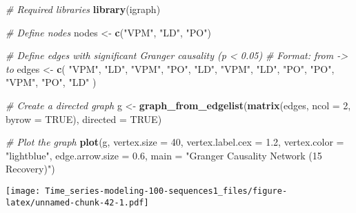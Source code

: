 \documentclass[
]{article}
\newenvironment{Shaded}{\begin{snugshade}}{\end{snugshade}}
\newcommand{\AttributeTok}[1]{\textcolor[rgb]{0.13,0.29,0.53}{#1}}
\newcommand{\CommentTok}[1]{\textcolor[rgb]{0.56,0.35,0.01}{\textit{#1}}}
\newcommand{\ConstantTok}[1]{\textcolor[rgb]{0.56,0.35,0.01}{#1}}
\newcommand{\DecValTok}[1]{\textcolor[rgb]{0.00,0.00,0.81}{#1}}
\newcommand{\FloatTok}[1]{\textcolor[rgb]{0.00,0.00,0.81}{#1}}
\newcommand{\FunctionTok}[1]{\textcolor[rgb]{0.13,0.29,0.53}{\textbf{#1}}}
\newcommand{\NormalTok}[1]{#1}
\newcommand{\OtherTok}[1]{\textcolor[rgb]{0.56,0.35,0.01}{#1}}
\newcommand{\StringTok}[1]{\textcolor[rgb]{0.31,0.60,0.02}{#1}}
\begin{document}
\begin{Shaded}
\begin{Highlighting}[]
\CommentTok{\# Required libraries}
\FunctionTok{library}\NormalTok{(igraph)}

\CommentTok{\# Define nodes}
\NormalTok{nodes }\OtherTok{\textless{}{-}} \FunctionTok{c}\NormalTok{(}\StringTok{"VPM"}\NormalTok{, }\StringTok{"LD"}\NormalTok{, }\StringTok{"PO"}\NormalTok{)}

\CommentTok{\# Define edges with significant Granger causality (p \textless{} 0.05)}
\CommentTok{\# Format: from {-}\textgreater{} to}
\NormalTok{edges }\OtherTok{\textless{}{-}} \FunctionTok{c}\NormalTok{(}
  \StringTok{"VPM"}\NormalTok{, }\StringTok{"LD"}\NormalTok{,}
  \StringTok{"VPM"}\NormalTok{, }\StringTok{"PO"}\NormalTok{,}
  \StringTok{"LD"}\NormalTok{, }\StringTok{"VPM"}\NormalTok{,}
  \StringTok{"LD"}\NormalTok{, }\StringTok{"PO"}\NormalTok{,}
  \StringTok{"PO"}\NormalTok{, }\StringTok{"VPM"}\NormalTok{,}
  \StringTok{"PO"}\NormalTok{, }\StringTok{"LD"}
\NormalTok{)}

\CommentTok{\# Create a directed graph}
\NormalTok{g }\OtherTok{\textless{}{-}} \FunctionTok{graph\_from\_edgelist}\NormalTok{(}\FunctionTok{matrix}\NormalTok{(edges, }\AttributeTok{ncol =} \DecValTok{2}\NormalTok{, }\AttributeTok{byrow =} \ConstantTok{TRUE}\NormalTok{), }\AttributeTok{directed =} \ConstantTok{TRUE}\NormalTok{)}

\CommentTok{\# Plot the graph}
\FunctionTok{plot}\NormalTok{(g,}
     \AttributeTok{vertex.size =} \DecValTok{40}\NormalTok{,}
     \AttributeTok{vertex.label.cex =} \FloatTok{1.2}\NormalTok{,}
     \AttributeTok{vertex.color =} \StringTok{"lightblue"}\NormalTok{,}
     \AttributeTok{edge.arrow.size =} \FloatTok{0.6}\NormalTok{,}
     \AttributeTok{main =} \StringTok{"Granger Causality Network (15 Recovery)"}\NormalTok{)}
\end{Highlighting}
\end{Shaded}

\texttt{[image: Time\_series-modeling-100-sequences1\_files/figure-latex/unnamed-chunk-42-1.pdf]}
\end{document}
